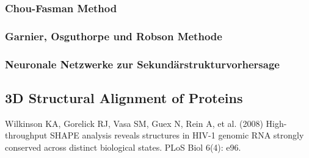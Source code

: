 \documentclass
[
   draft,     %
   paper=a4,%
   paper=portrait, %
   pagesize=auto, %
   fontsize=11pt,%
   abstract=true, %
   titlepage=true %
 ]
 {scrartcl}
\begin{document}
\subsubsection{Chou-Fasman Method}

\subsubsection{\textbf{G}arnier, \textbf{O}sguthorpe und \textbf{R}obson Methode}

\subsubsection{Neuronale Netzwerke zur Sekundärstrukturvorhersage}

\subsection{3D Structural Alignment of Proteins}



\begin{thebibliography}{----}
  Wilkinson KA, Gorelick RJ, Vasa SM, Guex N, Rein A, et al. (2008) High-throughput SHAPE analysis reveals structures in HIV-1 genomic RNA strongly conserved across distinct biological states. PLoS Biol 6(4): e96.
\end{thebibliography}
\end{document}
